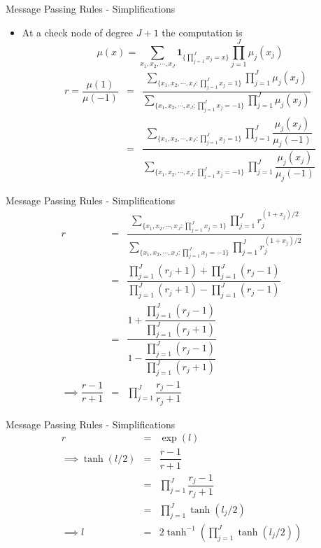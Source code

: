 \documentclass{beamer}
\begin{document}
 \begin{frame}{Message Passing Rules - Simplifications}
 \begin{itemize} \itemsep 0.2cm
  \item At a check node of degree $J + 1$ the computation is
  \begin{equation}
   \mu(x) = \sum_{x_1, x_2, \cdots, x_J} \mathbf{1}_{\lbrace \prod_{j = 1}^J x_j = x\rbrace} \prod_{j = 1}^J \mu_j(x_j)
  \end{equation}
  \begin{eqnarray}
   r = \dfrac{\mu(1)}{\mu(-1)} &=& \dfrac{\sum_{\lbrace x_1, x_2, \cdots, x_J : \prod_{j = 1}^J x_j = 1\rbrace} \prod_{j = 1}^J \mu_j(x_j)}{\sum_{\lbrace x_1, x_2, \cdots, x_J : \prod_{j = 1}^J x_j = -1 \rbrace} \prod_{j = 1}^J \mu_j(x_j)} \\
   &=& \dfrac{\sum_{\lbrace x_1, x_2, \cdots, x_J : \prod_{j = 1}^J x_j = 1\rbrace} \prod_{j = 1}^J \dfrac{\mu_j(x_j)}{\mu_j(-1)}}{\sum_{\lbrace x_1, x_2, \cdots, x_J : \prod_{j = 1}^J x_j = -1\rbrace} \prod_{j = 1}^J \dfrac{\mu_j(x_j)}{\mu_j(-1)}}
  \end{eqnarray}

 
 \end{itemize}
 
 \end{frame}
 \begin{frame}{Message Passing Rules - Simplifications}
    \begin{eqnarray}
   r &=& \dfrac{\sum_{\lbrace x_1, x_2, \cdots, x_J : \prod_{j = 1}^J x_j = 1 \rbrace} \prod_{j = 1}^J r_j^{(1 + x_j)/2}}{\sum_{\lbrace x_1, x_2, \cdots, x_J : \prod_{j = 1}^J x_j = -1\rbrace} \prod_{j = 1}^J r_j^{(1 + x_j)/2}} \\
   &=& \dfrac{\prod_{j = 1}^J (r_j + 1) + \prod_{j = 1}^J (r_j - 1)}{\prod_{j = 1}^J (r_j + 1) - \prod_{j = 1}^J (r_j - 1)} \\
   &=& \dfrac{1 + \dfrac{\prod_{j = 1}^J (r_j - 1)}{\prod_{j = 1}^J (r_j + 1)}}{1 - \dfrac{\prod_{j = 1}^J (r_j - 1)}{\prod_{j = 1}^J (r_j + 1)}} \\
   \implies \dfrac{r - 1}{r + 1} &=& \prod_{j = 1}^{J} \dfrac{r_j - 1}{r_j + 1}
  \end{eqnarray}
 \end{frame}

 \begin{frame}{Message Passing Rules - Simplifications}
  \begin{eqnarray}
   r &=& \exp (l) \\
   \implies \tanh(l/2) &=& \dfrac{r - 1}{r + 1} \\
   &=& \prod_{j = 1}^{J} \dfrac{r_j - 1}{r_j + 1} \\
   &=& \prod_{j = 1}^{J} \tanh(l_j/2) \\
   \implies l &=& 2\tanh^{-1} \left( \prod_{j = 1}^{J} \tanh(l_j/2) \right)
  \end{eqnarray}
 \end{frame}
 
\end{document}
